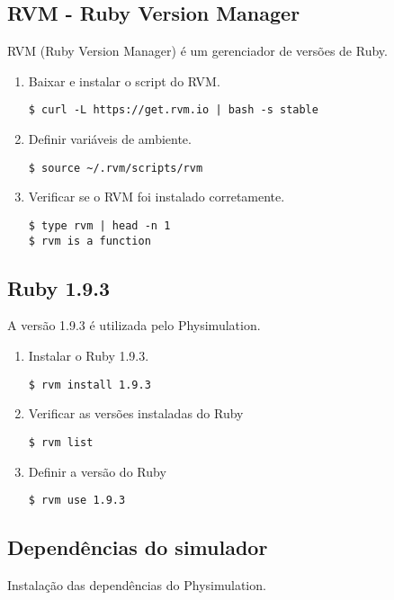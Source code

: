 \subsection{RVM - Ruby Version Manager}

RVM (Ruby Version Manager) é um gerenciador de versões de Ruby. 

\begin{enumerate}
\item Baixar e instalar o script do RVM.
\begin{verbatim}
$ curl -L https://get.rvm.io | bash -s stable
\end{verbatim}
\item Definir variáveis de ambiente.
\begin{verbatim}
$ source ~/.rvm/scripts/rvm
\end{verbatim}
\item Verificar se o RVM foi instalado corretamente.
\begin{verbatim}
$ type rvm | head -n 1
$ rvm is a function
\end{verbatim}
\end{enumerate}

\subsection{Ruby 1.9.3}

A versão 1.9.3 é utilizada pelo Physimulation.

\begin{enumerate}
\item Instalar o Ruby 1.9.3.
\begin{verbatim}
$ rvm install 1.9.3
\end{verbatim}
\item Verificar as versões instaladas do Ruby
\begin{verbatim}
$ rvm list
\end{verbatim}
\item Definir a versão do Ruby
\begin{verbatim}
$ rvm use 1.9.3
\end{verbatim}
\end{enumerate}

\subsection{Dependências do simulador}

Instalação das dependências do Physimulation.

